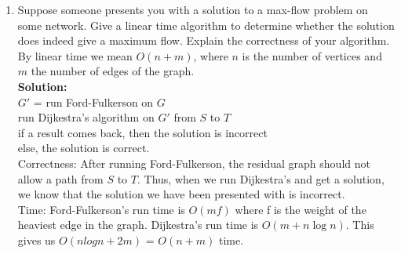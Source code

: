 \documentclass[11pt]{article}
\begin{document}
\begin{enumerate}
\item Suppose someone presents you with a solution to a max-flow
  problem on some network. Give a linear time algorithm to determine
  whether the solution does indeed give a maximum flow. Explain the
  correctness of your algorithm. By linear time we mean
$O(n+m)$, where $n$ is the number of vertices and $m$ the
number of edges of the graph.\\
\textbf{Solution:}\\
$G'$ = run Ford-Fulkerson on $G$\\
run Dijkestra's algorithm on $G'$ from $S$ to $T$\\
\hspace*{2cm} if a result comes back, then the solution is incorrect\\
\hspace*{2cm} else, the solution is correct.\\

Correctness: After running Ford-Fulkerson, the residual graph should not allow a path from $S$ to $T$. Thus, when we run Dijkestra's and get a solution, we know that the solution we have been presented with is incorrect.\\
Time: Ford-Fulkerson's run time is $O(mf)$ where f is the weight of the heaviest edge in the graph. Dijkestra's run time is $O(m + n \log n)$. This gives us $O(n log n + 2m)$ = $O(n + m)$ time.

\end{enumerate}
\end{document}
